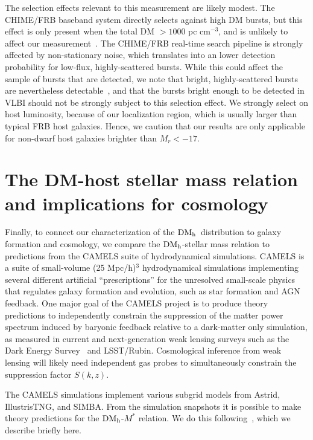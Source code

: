 \documentclass[twocolumn]{aastex631}
\newcommand{\dmh}{\ensuremath{{\rm DM}_\textrm{h}}}
\begin{document}
The selection effects relevant to this measurement are likely modest. The CHIME/FRB baseband system directly selects against high DM bursts, but this effect is only present when the total DM $> 1000$ pc cm$^{-3}$, and is unlikely to affect our measurement~\citep{collaboration2021first,shin2023inferring}. The CHIME/FRB real-time search pipeline is strongly affected by non-stationary noise, which translates into an lower detection probability for low-flux, highly-scattered bursts. While this could affect the sample of bursts that are detected, we note that bright, highly-scattered bursts are nevertheless detectable~\citep{shin2024investigating}, and that the bursts bright enough to be detected in VLBI should not be strongly subject to this selection effect. We strongly select on host luminosity, because of our localization region, which is usually larger than typical FRB host galaxies. Hence, we caution that our results are only applicable for non-dwarf host galaxies brighter than $M_r < -17$.

\section{The DM-host stellar mass relation and implications for cosmology}\label{sec:camels}
Finally, to connect our characterization of the \dmh\ distribution to galaxy formation and cosmology, we compare the \dmh-stellar mass relation to predictions from the CAMELS suite of hydrodynamical simulations. CAMELS is a suite of small-volume (25 Mpc/h)$^3$ hydrodynamical simulations implementing several different artificial ``prescriptions'' for the unresolved small-scale physics that regulates galaxy formation and evolution, such as star formation and AGN feedback. One major goal of the CAMELS project is to produce theory predictions to independently constrain the suppression of the matter power spectrum induced by baryonic feedback relative to a dark-matter only simulation, as measured in current and next-generation weak lensing surveys such as the Dark Energy Survey~\citep{chen2023constraining,aric_o2023des} and LSST/Rubin. Cosmological inference from weak lensing will likely need independent gas probes to simultaneously constrain the suppression factor $S(k,z)$.

The CAMELS simulations implement various subgrid models from Astrid, IllustrisTNG, and SIMBA. From the simulation snapshots it is possible to make theory predictions for the \dmh-$M^*$ relation. We do this following~\citet{medlock2024probing}, which we describe briefly here.
\end{document}

